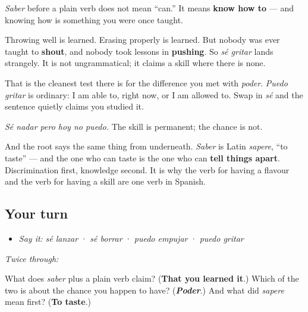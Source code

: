 \begin{culture}
\emph{Saber} before a plain verb does not mean \textquotedblleft{}can.\textquotedblright{} It means \textbf{know how to} — and knowing how is something you were once taught.

Throwing well is learned. Erasing properly is learned. But nobody was ever taught to \textbf{shout}, and nobody took lessons in \textbf{pushing}. So \emph{sé gritar} lands strangely. It is not ungrammatical; it claims a skill where there is none.

That is the cleanest test there is for the difference you met with \emph{poder}. \emph{Puedo gritar} is ordinary: I am able to, right now, or I am allowed to. Swap in \emph{sé} and the sentence quietly claims you studied it.

\emph{Sé nadar pero hoy no puedo.} The skill is permanent; the chance is not.

And the root says the same thing from underneath. \emph{Saber} is Latin \emph{sapere}, \textquotedblleft{}to taste\textquotedblright{} — and the one who can taste is the one who can \textbf{tell things apart}. Discrimination first, knowledge second. It is why the verb for having a flavour and the verb for having a skill are one verb in Spanish.
\end{culture}

\subsection*{Your turn}
\begin{itemize}
\raggedright
  \item \emph{Say it:} \emph{sé lanzar} · \emph{sé borrar} · \emph{puedo empujar} · \emph{puedo gritar}
\end{itemize}

\emph{Twice through:}

\begin{tcolorbox}[breakable,colback=teal!4,colframe=teal!35!black,title={Before you move on}]
What does \emph{saber} plus a plain verb claim? (\textbf{That you learned it}.) Which of the two is about the chance you happen to have? (\emph{\textbf{Poder}}.) And what did \emph{sapere} mean first? (\textbf{To taste}.)
\end{tcolorbox}
